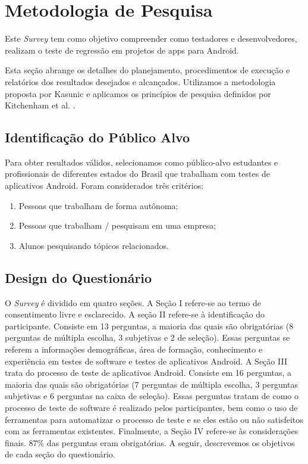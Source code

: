 \section{Metodologia de Pesquisa}\label{rmsurvey}

Este \textit{Survey} tem como objetivo compreender como testadores e desenvolvedores, realizam o teste de regressão em projetos de apps para Android.

Esta seção abrange os detalhes do planejamento, procedimentos de execução e relatórios dos resultados desejados e alcançados. Utilizamos a metodologia proposta por Kasunic \cite{Kasunic2005DesigningAE} e aplicamos os princípios de pesquisa definidos por Kitchenham et al. \cite{Kitchenham:2002:PSR:566493.566495}.


\subsection{Identificação do Público Alvo}

Para obter resultados válidos, selecionamos como público-alvo estudantes e profissionais de diferentes estados do Brasil que trabalham com testes de aplicativos Android. Foram considerados três critérios:

\begin{enumerate}
    \item Pessoas que trabalham de forma autônoma; 
    \item Pessoas que trabalham / pesquisam em uma empresa; 
    \item Alunos pesquisando tópicos relacionados.
\end{enumerate}

\subsection{Design do Questionário}


O \textit{Survey} é dividido em quatro seções. A Seção I refere-se ao termo de consentimento livre e esclarecido. A seção II refere-se à identificação do participante. Consiste em 13 perguntas, a maioria das quais são obrigatórias (8 perguntas de múltipla escolha, 3 subjetivas e 2 de seleção). Essas perguntas se referem a informações demográficas, área de formação, conhecimento e experiência em testes de software e testes de aplicativos Android. A Seção III trata do processo de teste de aplicativos Android. Consiste em 16 perguntas, a maioria das quais são obrigatórias (7 perguntas de múltipla escolha, 3 perguntas subjetivas e 6 perguntas na caixa de seleção). Essas perguntas tratam de como o processo de teste de software é realizado pelos participantes, bem como o uso de ferramentas para automatizar o processo de teste e se eles estão ou não satisfeitos com as ferramentas existentes. Finalmente, a Seção IV refere-se às considerações finais. 87\% das perguntas eram obrigatórias. A seguir, descrevemos os objetivos de cada seção do questionário.


